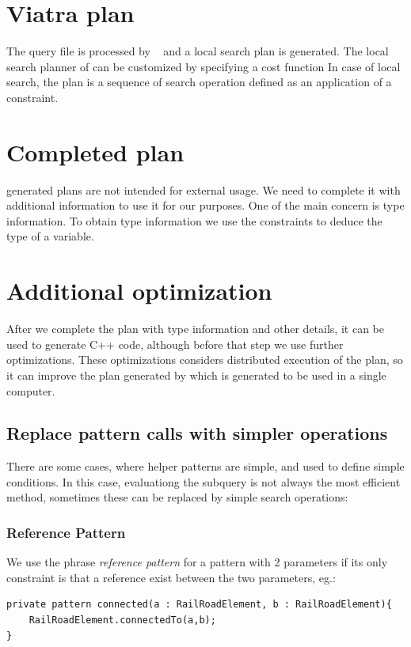 \section{Viatra plan}

The query file is processed by \viatra{}~\cite{viatra} and a local search plan is generated. 
The local search planner of \viatra{} can be customized by specifying a cost function
In case of local search, the plan is a sequence of search operation defined as an application of a constraint.

\section{Completed plan}

\viatra{} generated plans are not intended for external usage. 
We need to complete it with additional information to use it for our purposes. 
One of the main concern is type information. To obtain type information we use the constraints to deduce the type of a variable. 


\section{Additional optimization}

After we complete the plan with type information and other details, it can be used to generate C++ code, although before that step we use further optimizations. 
These optimizations considers distributed execution of the plan, so it can improve the plan generated by \viatra{} which is generated to be used in a single computer.


\subsection{Replace pattern calls with simpler operations}
There are some cases, where helper patterns are simple, and used to define simple conditions. 
In this case, evaluationg the subquery is not always the most efficient method, sometimes these can be replaced by simple search operations:

\subsubsection{Reference Pattern}
We use the phrase \emph{reference pattern} for a pattern with 2 parameters if its only constraint is that a reference exist between the two parameters, eg.:
\begin{lstlisting}[language = vql]
private pattern connected(a : RailRoadElement, b : RailRoadElement){
	RailRoadElement.connectedTo(a,b);
}
\end{lstlisting}

